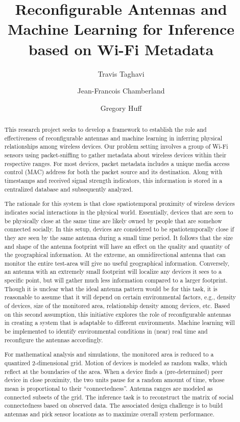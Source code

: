 \documentclass{ursiNRSM}
\title{Reconfigurable Antennas and Machine Learning for Inference based on Wi-Fi Metadata}
\author[org1]{Travis Taghavi}
\author[org1]{Jean-Francois Chamberland}
\author[org1]{Gregory Huff}
\begin{document}
\begin{abstract}

This research project seeks to develop a framework to establish the role and effectiveness of reconfigurable antennas and machine learning in inferring physical relationships among wireless devices.
Our problem setting involves a group of Wi-Fi sensors using packet-sniffing to gather metadata about wireless devices within their respective ranges.
For most devices, packet metadata includes a unique media access control (MAC) address for both the packet source and its destination.
Along with timestamps and received signal strength indicators, this information is stored in a centralized database and subsequently analyzed.

The rationale for this system is that close spatiotemporal proximity of wireless devices indicates social interactions in the physical world.
Essentially, devices that are seen to be physically close at the same time are likely owned by people that are somehow connected socially.
In this setup, devices are considered to be spatiotemporally close if they are seen by the same antenna during a small time period.
It follows that the size and shape of the antenna footprint will have an effect on the quality and quantity of the geographical information.
At the extreme, an omnidirectional antenna that can monitor the entire test-area will give no useful geographical information.
Conversely, an antenna with an extremely small footprint will localize any devices it sees to a specific point, but will gather much less information compared to a larger footprint.
Though it is unclear what the ideal antenna pattern would be for this task, it is reasonable to assume that it will depend on certain environmental factors, e.g., density of devices, size of the monitored area, relationship density among devices, etc.
Based on this second assumption, this initiative explores the role of reconfigurable antennas in creating a system that is adaptable to different environments.
Machine learning will be implemented to identify environmental conditions in (near) real time and reconfigure the antennas accordingly.

For mathematical analysis and simulations, the monitored area is reduced to a quantized 2-dimensional grid.
Motion of devices is modeled as random walks, which reflect at the boundaries of the area.
When a device finds a (pre-determined) peer device in close proximity, the two units pause for a random amount of time, whose mean is proportional to their ``connectedness''.
Antenna ranges are modeled as connected subsets of the grid.
The inference task is to reconstruct the matrix of social connectedness based on observed data.
The associated design challenge is to build antennas and pick sensor locations as to maximize overall system performance.

\end{abstract}
\end{document}
